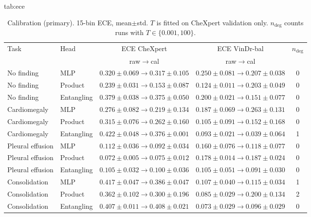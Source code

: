 \documentclass{midl} %
\begin{document}
\begin{table}[ht]
\floatconts
  {tab:ece}
  {\caption{Calibration (primary). 15-bin ECE, mean$\pm$std. $T$ is fitted on CheXpert validation only. $n_{\mathrm{deg}}$ counts runs with $T\in\{0.001,100\}$.}}
  {\small\setlength{\tabcolsep}{4pt}\begin{tabular}{@{}llccc@{}}
  \toprule
  Task & Head & ECE CheXpert & ECE VinDr-bal & $n_{\mathrm{deg}}$ \\
       & & raw$\to$cal & raw$\to$cal & \\
  \midrule
  No finding & MLP & $0.320\pm0.069\to0.317\pm0.105$ & $0.250\pm0.081\to0.207\pm0.038$ & 0 \\
  No finding & Product & $0.239\pm0.031\to0.153\pm0.087$ & $0.124\pm0.011\to0.203\pm0.049$ & 0 \\
  No finding & Entangling & $0.379\pm0.038\to0.375\pm0.050$ & $0.200\pm0.021\to0.151\pm0.077$ & 0 \\
  Cardiomegaly & MLP & $0.276\pm0.082\to0.219\pm0.134$ & $0.187\pm0.069\to0.263\pm0.131$ & 0 \\
  Cardiomegaly & Product & $0.315\pm0.076\to0.262\pm0.160$ & $0.105\pm0.091\to0.152\pm0.168$ & 0 \\
  Cardiomegaly & Entangling & $0.422\pm0.048\to0.376\pm0.001$ & $0.093\pm0.021\to0.039\pm0.064$ & 1 \\
  Pleural effusion & MLP & $0.112\pm0.036\to0.092\pm0.034$ & $0.160\pm0.076\to0.118\pm0.077$ & 0 \\
  Pleural effusion & Product & $0.072\pm0.005\to0.075\pm0.012$ & $0.178\pm0.014\to0.187\pm0.024$ & 0 \\
  Pleural effusion & Entangling & $0.105\pm0.032\to0.100\pm0.036$ & $0.105\pm0.051\to0.091\pm0.030$ & 0 \\
  Consolidation & MLP & $0.417\pm0.047\to0.386\pm0.047$ & $0.107\pm0.040\to0.115\pm0.034$ & 1 \\
  Consolidation & Product & $0.362\pm0.102\to0.300\pm0.196$ & $0.085\pm0.029\to0.200\pm0.134$ & 2 \\
  Consolidation & Entangling & $0.407\pm0.011\to0.408\pm0.021$ & $0.073\pm0.029\to0.096\pm0.029$ & 0 \\
  \bottomrule
  \end{tabular}}
\end{table}
\end{document}
